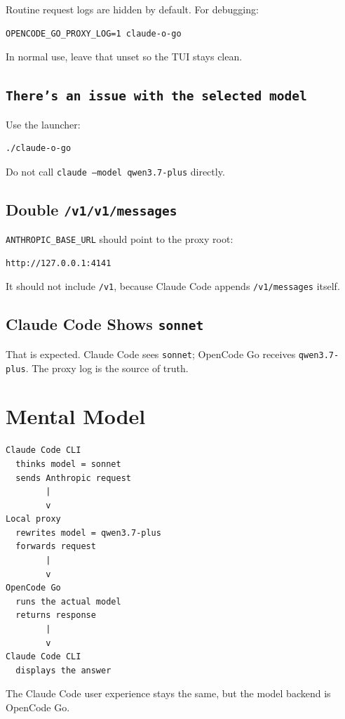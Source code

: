 \documentclass[11pt,a4paper]{article}
\newcommand{\code}[1]{\texttt{#1}}
\begin{document}
Routine request logs are hidden by default. For debugging:

\begin{verbatim}
OPENCODE_GO_PROXY_LOG=1 claude-o-go
\end{verbatim}

In normal use, leave that unset so the TUI stays clean.

\subsection{\code{There's an issue with the selected model}}

Use the launcher:

\begin{verbatim}
./claude-o-go
\end{verbatim}

Do not call \code{claude --model qwen3.7-plus} directly.

\subsection{Double \code{/v1/v1/messages}}

\code{ANTHROPIC\_BASE\_URL} should point to the proxy root:

\begin{verbatim}
http://127.0.0.1:4141
\end{verbatim}

It should not include \code{/v1}, because Claude Code appends
\code{/v1/messages} itself.

\subsection{Claude Code Shows \code{sonnet}}

That is expected. Claude Code sees \code{sonnet}; OpenCode Go receives
\code{qwen3.7-plus}. The proxy log is the source of truth.

\section{Mental Model}

\begin{verbatim}
Claude Code CLI
  thinks model = sonnet
  sends Anthropic request
        |
        v
Local proxy
  rewrites model = qwen3.7-plus
  forwards request
        |
        v
OpenCode Go
  runs the actual model
  returns response
        |
        v
Claude Code CLI
  displays the answer
\end{verbatim}

The Claude Code user experience stays the same, but the model backend is
OpenCode Go.
\end{document}
